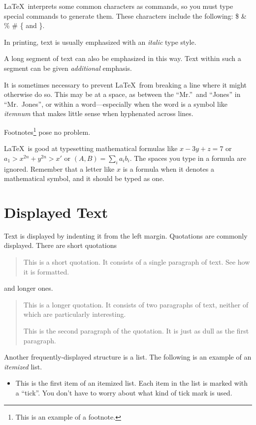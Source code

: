 \documentclass{article}      %
\newcommand{\ip}[2]{(#1, #2)}
\begin{document}
\begin{CJK}{UTF8}{gkai}
\LaTeX\ interprets some common characters as
commands, so you must type special commands to
generate them.  These characters include the
following:
       \$ \& \% \# \{ and \}.

In printing, text is usually emphasized with an
       \emph{italic}  
type style.  

\begin{em}
   A long segment of text can also be emphasized 
   in this way.  Text within such a segment can be 
   given \emph{additional} emphasis.
\end{em}

It is sometimes necessary to prevent \LaTeX\ from
breaking a line where it might otherwise do so.
This may be at a space, as between the ``Mr.''\ and
``Jones'' in
       ``Mr.~Jones'',        %
or within a word---especially when the word is a
symbol like
       \mbox{\emph{itemnum}} 
that makes little sense when hyphenated across
lines.

Footnotes\footnote{This is an example of a footnote.}
pose no problem.

\LaTeX\ is good at typesetting mathematical formulas
like
       \( x-3y + z = 7 \) 
or
       \( a_{1} > x^{2n} + y^{2n} > x' \)
or  
       \( \ip{A}{B} = \sum_{i} a_{i} b_{i} \).
The spaces you type in a formula are 
ignored.  Remember that a letter like
       $x$                   %
is a formula when it denotes a mathematical
symbol, and it should be typed as one.

\section{Displayed Text}

Text is displayed by indenting it from the left
margin.  Quotations are commonly displayed.  There
are short quotations
\begin{quote}
   This is a short quotation.  It consists of a 
   single paragraph of text.  See how it is formatted.
\end{quote}
and longer ones.
\begin{quotation}
   This is a longer quotation.  It consists of two
   paragraphs of text, neither of which are
   particularly interesting.

   This is the second paragraph of the quotation.  It
   is just as dull as the first paragraph.
\end{quotation}
Another frequently-displayed structure is a list.
The following is an example of an \emph{itemized}
list.
\begin{itemize}
   \item This is the first item of an itemized list.
         Each item in the list is marked with a ``tick''.
         You don't have to worry about what kind of tick
         mark is used.


\end{itemize}
\end{CJK}
\end{document}
